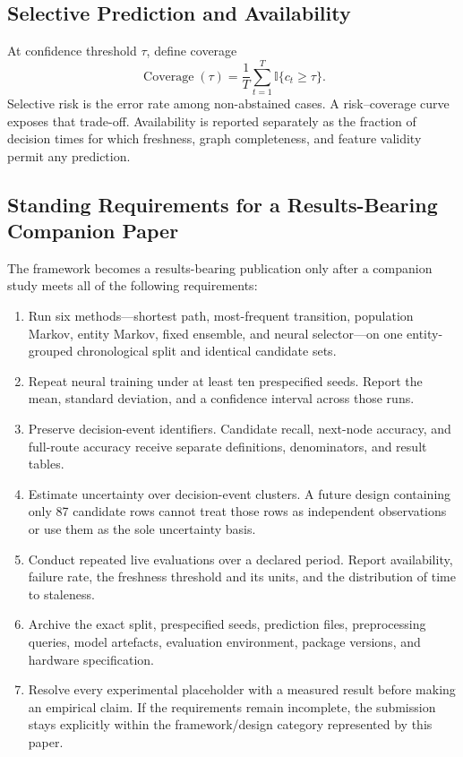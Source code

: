 \documentclass[11pt,letterpaper]{article}
\newcommand{\ind}{\mathbb{I}}
\begin{document}
\subsection{Selective Prediction and Availability}

At confidence threshold $\tau$, define coverage
\begin{equation}
\operatorname{Coverage}(\tau)=\frac{1}{T}\sum_{t=1}^{T}\ind\{c_t\geq\tau\}.
\end{equation}
Selective risk is the error rate among non-abstained cases. A risk--coverage curve exposes that trade-off. Availability is reported separately as the fraction of decision times for which freshness, graph completeness, and feature validity permit any prediction.

\subsection{Standing Requirements for a Results-Bearing Companion Paper}
\label{sec:standing-requirements}

The framework becomes a results-bearing publication only after a companion study meets all of the following requirements:

\begin{enumerate}
  \item Run six methods---shortest path, most-frequent transition, population Markov, entity Markov, fixed ensemble, and neural selector---on one entity-grouped chronological split and identical candidate sets.
  \item Repeat neural training under at least ten prespecified seeds. Report the mean, standard deviation, and a confidence interval across those runs.
  \item Preserve decision-event identifiers. Candidate recall, next-node accuracy, and full-route accuracy receive separate definitions, denominators, and result tables.
  \item Estimate uncertainty over decision-event clusters. A future design containing only 87 candidate rows cannot treat those rows as independent observations or use them as the sole uncertainty basis.
  \item Conduct repeated live evaluations over a declared period. Report availability, failure rate, the freshness threshold and its units, and the distribution of time to staleness.
  \item Archive the exact split, prespecified seeds, prediction files, preprocessing queries, model artefacts, evaluation environment, package versions, and hardware specification.
  \item Resolve every experimental placeholder with a measured result before making an empirical claim. If the requirements remain incomplete, the submission stays explicitly within the framework/design category represented by this paper.
\end{enumerate}
\end{document}
